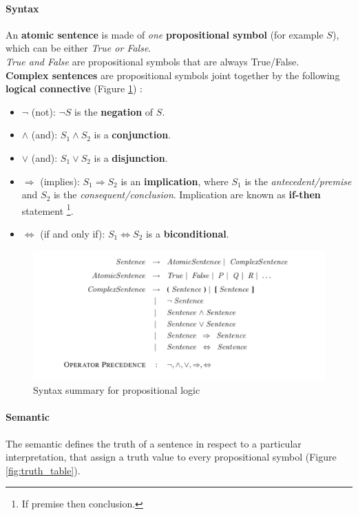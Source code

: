 \documentclass[10pt,a4paper]{article}
\begin{document}
\paragraph{Syntax}
\label{par:syntax}
An \textbf{atomic sentence} is made of \textit{one} \textbf{propositional symbol} (for example $S$), which can be either \textit{True or False}.\\
\textit{True and False} are propositional symbols that are always True/False.\\
\textbf{Complex sentences} are propositional symbols joint together by the following \textbf{logical connective} (Figure \ref{fig:prop_synt}) :
\begin{itemize}
\item $\neg$ (not): $\neg S$ is the \textbf{negation} of $S$.
\item $\wedge$ (and): $S_1\wedge S_2$ is a \textbf{conjunction}.
\item $\vee$ (and): $S_1\vee S_2$ is a \textbf{disjunction}.
\item $\Rightarrow$ (implies): $S_1\Rightarrow S_2$ is an \textbf{implication}, where $S_1$ is the \textit{antecedent/premise} and $S_2$ is the \textit{consequent/conclusion}. Implication are known as \textbf{if-then} statement \footnote{If premise then conclusion.}.
\item $\Leftrightarrow$ (if and only if): $S_1\Leftrightarrow S_2$ is a \textbf{biconditional}.
\end{itemize}

\begin{figure}[H]
\includegraphics[scale=0.7]{images/prop_syntax.png}
\caption{Syntax summary for propositional logic}
\label{fig:prop_synt}
\end{figure}

\paragraph{Semantic}
The semantic defines the truth of a sentence in respect to a particular interpretation, that assign a truth value to every propositional symbol (Figure \ref{fig:truth_table}).
\end{document}
